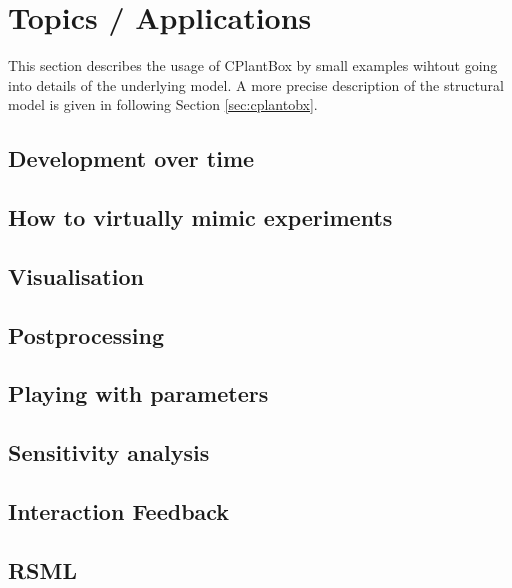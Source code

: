 \documentclass[a4paper]{article}
\begin{document}
\newpage
\section{Topics / Applications} \label{sec:topcis}

This section describes the usage of CPlantBox by small examples wihtout going into details of the underlying model. A more precise description of the structural model is given in following Section \ref{sec:cplantobx}. 

\subsection{Development over time} \label{ssec:development}


\subsection{How to virtually mimic experiments} \label{ssec:virtual}


\subsection{Visualisation} \label{ssec:visualisation}
%

\subsection{Postprocessing} \label{ssec:postprocessing}
%

\subsection{Playing with parameters} \label{ssec:parameters}
%

\subsection{Sensitivity analysis} \label{ssec:sa}
%

\subsection{Interaction Feedback} \label{ssec:interaction}
%

\subsection{RSML} \label{ssec:rsml}
%
\end{document}
